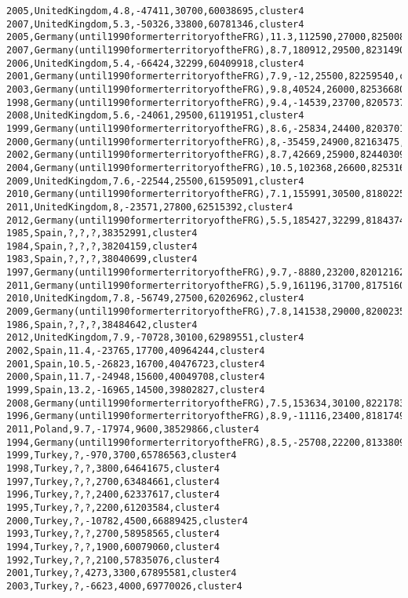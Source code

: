 \begin{lstlisting}[basicstyle=\footnotesize\ttfamily,numbers=none]
2005,UnitedKingdom,4.8,-47411,30700,60038695,cluster4
2007,UnitedKingdom,5.3,-50326,33800,60781346,cluster4
2005,Germany(until1990formerterritoryoftheFRG),11.3,112590,27000,82500849,cluster4
2007,Germany(until1990formerterritoryoftheFRG),8.7,180912,29500,82314906,cluster4
2006,UnitedKingdom,5.4,-66424,32299,60409918,cluster4
2001,Germany(until1990formerterritoryoftheFRG),7.9,-12,25500,82259540,cluster4
2003,Germany(until1990formerterritoryoftheFRG),9.8,40524,26000,82536680,cluster4
1998,Germany(until1990formerterritoryoftheFRG),9.4,-14539,23700,82057379,cluster4
2008,UnitedKingdom,5.6,-24061,29500,61191951,cluster4
1999,Germany(until1990formerterritoryoftheFRG),8.6,-25834,24400,82037011,cluster4
2000,Germany(until1990formerterritoryoftheFRG),8,-35459,24900,82163475,cluster4
2002,Germany(until1990formerterritoryoftheFRG),8.7,42669,25900,82440309,cluster4
2004,Germany(until1990formerterritoryoftheFRG),10.5,102368,26600,82531671,cluster4
2009,UnitedKingdom,7.6,-22544,25500,61595091,cluster4
2010,Germany(until1990formerterritoryoftheFRG),7.1,155991,30500,81802257,cluster4
2011,UnitedKingdom,8,-23571,27800,62515392,cluster4
2012,Germany(until1990formerterritoryoftheFRG),5.5,185427,32299,81843743,cluster4
1985,Spain,?,?,?,38352991,cluster4
1984,Spain,?,?,?,38204159,cluster4
1983,Spain,?,?,?,38040699,cluster4
1997,Germany(until1990formerterritoryoftheFRG),9.7,-8880,23200,82012162,cluster4
2011,Germany(until1990formerterritoryoftheFRG),5.9,161196,31700,81751602,cluster4
2010,UnitedKingdom,7.8,-56749,27500,62026962,cluster4
2009,Germany(until1990formerterritoryoftheFRG),7.8,141538,29000,82002356,cluster4
1986,Spain,?,?,?,38484642,cluster4
2012,UnitedKingdom,7.9,-70728,30100,62989551,cluster4
2002,Spain,11.4,-23765,17700,40964244,cluster4
2001,Spain,10.5,-26823,16700,40476723,cluster4
2000,Spain,11.7,-24948,15600,40049708,cluster4
1999,Spain,13.2,-16965,14500,39802827,cluster4
2008,Germany(until1990formerterritoryoftheFRG),7.5,153634,30100,82217837,cluster4
1996,Germany(until1990formerterritoryoftheFRG),8.9,-11116,23400,81817499,cluster4
2011,Poland,9.7,-17974,9600,38529866,cluster4
1994,Germany(until1990formerterritoryoftheFRG),8.5,-25708,22200,81338093,cluster4
1999,Turkey,?,-970,3700,65786563,cluster4
1998,Turkey,?,?,3800,64641675,cluster4
1997,Turkey,?,?,2700,63484661,cluster4
1996,Turkey,?,?,2400,62337617,cluster4
1995,Turkey,?,?,2200,61203584,cluster4
2000,Turkey,?,-10782,4500,66889425,cluster4
1993,Turkey,?,?,2700,58958565,cluster4
1994,Turkey,?,?,1900,60079060,cluster4
1992,Turkey,?,?,2100,57835076,cluster4
2001,Turkey,?,4273,3300,67895581,cluster4
2003,Turkey,?,-6623,4000,69770026,cluster4

\end{lstlisting}
